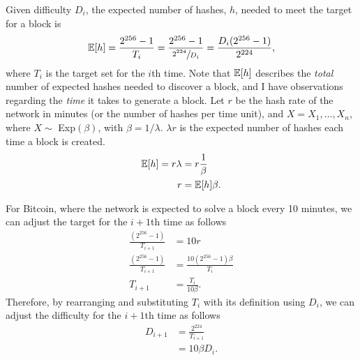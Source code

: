 Given difficulty $D_i$, the expected number of hashes, $h$, needed to meet the target for a block is
\begin{align}
\operatorname{\mathbb{E}}[h] =  \frac{2^{256}-1}{T_i} = \frac{2^{256}-1}{\sfrac{2^{224}}{D_i}} = \frac{D_i(2^{256}-1)}{2^{224}}, 
\end{align}
where $T_i$ is the target set for the $i$th time. Note that $\operatorname{\mathbb{E}}[h]$ describes the \textit{total} number of expected hashes needed to discover a block, and I have observations regarding the \textit{time} it takes to generate a block. Let $r$ be the hash rate of the network in minutes (or the number of hashes per time unit), and $X = X_1, \dots, X_{n}$, where $X \sim$ Exp$(\beta)$, with $\beta = 1/\lambda$. $\lambda r$ is the expected number of hashes each time a block is created.  %
\begin{align}
\operatorname{\mathbb{E}}[h] = r \lambda &= r \frac{1}{\beta}  \\
r &= \operatorname{\mathbb{E}}[h] \beta.
\end{align}

For Bitcoin, where the network is expected to solve a block every 10 minutes, we can adjust the target for the $i+1$th time as follows 
\begin{align}
\frac{(2^{256}-1)}{T_{i+1}} &= 10r \\
\frac{(2^{256}-1)}{T_{i+1}} &= \frac{10(2^{256}-1)\beta}{T_i} \\
T_{i+1} &= \frac{T_i}{10\beta}.
\end{align}
Therefore, by rearranging and substituting $T_i$ with its definition using $D_i$, we can adjust the difficulty for the $i+1$th time as follows 
\begin{align}
D_{i+1} &= \frac{2^{224}}{T_{i+1}} \\
&= 10\beta D_i.
\end{align}


